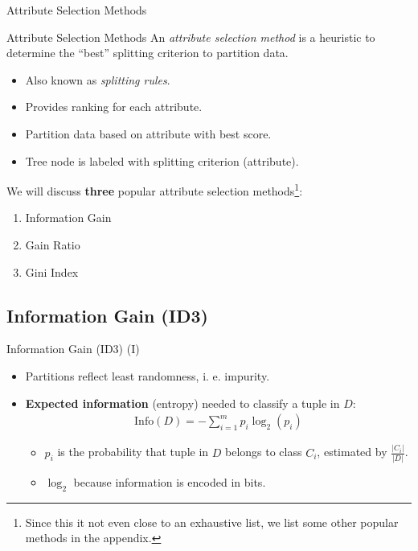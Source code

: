 \begin{frame}{Attribute Selection Methods}
	\begin{block}{Attribute Selection Methods}
		An \textit{attribute selection method} is a heuristic to determine the ``best'' splitting criterion to partition data.
	\end{block}

	\begin{itemize}
		\item Also known as \textit{splitting rules}.
		\item Provides ranking for each attribute.
		\item Partition data based on attribute with best score.
		\item Tree node is labeled with splitting criterion (attribute).
	\end{itemize} \medskip

	We will discuss \textbf{three} popular attribute selection methods\footnote{Since this it not even close to an exhaustive list, we list some other popular methods in the appendix.}:
	\begin{enumerate}
		\item Information Gain
		\item Gain Ratio
		\item Gini Index
	\end{enumerate}
\end{frame}

\subsection{Information Gain (ID3)}

\begin{frame}{Information Gain (ID3) (I)}
	\begin{itemize}
		\item Partitions reflect least randomness, i. e. impurity.
		\item \textbf{Expected information} (entropy) needed to classify a tuple in $D$:
		      \begin{align*}
			      \text{Info}(D) = -\sum_{i=1}^{m}p_i \log_2(p_i)
		      \end{align*}

		      \begin{itemize}
			      \item $p_i$ is the probability that tuple in $D$ belongs to class $C_i$, estimated by $\frac{|C_i|}{|D|}$.
			      \item $\log_2$ because information is encoded in bits.
		      \end{itemize}
	\end{itemize}
\end{frame}

